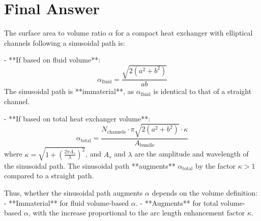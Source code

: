 \documentclass[]{article}
\begin{document}
\section{Final Answer}
The surface area to volume ratio \(\alpha\) for a compact heat exchanger with elliptical channels following a sinusoidal path is:

- **If based on fluid volume**:
\[
\alpha_{\text{fluid}} = \frac{\sqrt{2(a^2 + b^2)}}{a b}
\]
The sinusoidal path is **immaterial**, as \(\alpha_{\text{fluid}}\) is identical to that of a straight channel.

- **If based on total heat exchanger volume**:
\[
\alpha_{\text{total}} = \frac{N_{\text{channels}} \cdot \pi \sqrt{2(a^2 + b^2)} \cdot \kappa}{A_{\text{bundle}}}
\]
where \(\kappa = \sqrt{1 + \left(\frac{2\pi A_s}{\lambda}\right)^2}\), and \(A_s\) and \(\lambda\) are the amplitude and wavelength of the sinusoidal path. The sinusoidal path **augments** \(\alpha_{\text{total}}\) by the factor \(\kappa > 1\) compared to a straight path.

Thus, whether the sinusoidal path augments \(\alpha\) depends on the volume definition:
- **Immaterial** for fluid volume-based \(\alpha\).
- **Augments** for total volume-based \(\alpha\), with the increase proportional to the arc length enhancement factor \(\kappa\).
\end{document}

